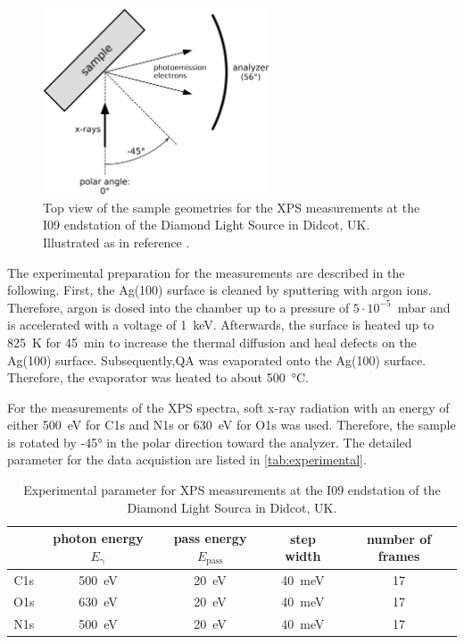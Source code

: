 \begin{figure}[htbp]
	\centering
	\includegraphics[width=0.6\textwidth]{images/experimental.png}
	\caption{Top view of the sample geometries for the \ac{XPS} measurements at the I09 endstation of the Diamond Light Source in Didcot, UK. Illustrated as in reference \cite{Kny2025}.}
	\label{fig:experimental}
\end{figure}

The experimental preparation for the measurements are described in the following. First, the Ag(100) surface is cleaned by sputtering with argon ions. Therefore, argon is dosed into the chamber up to a pressure of $5\cdot 10^{-5}$~\si{mbar} and is accelerated with a voltage of 1~\si{keV}. Afterwards, the surface is heated up to 825~\si{K} for 45~\si{min} to increase the thermal diffusion and heal defects on the Ag(100) surface.
Subsequently,\ac{QA} was evaporated onto the Ag(100) surface. Therefore, the evaporator was heated to about 500~\si{\degreeCelsius}.

For the measurements of the \ac{XPS} spectra, soft x-ray radiation with an energy of either 500~\si{\eV} for C1s and N1s or 630~\si{\eV} for O1s was used. Therefore, the sample is rotated by -45\si{\degree} in the polar direction toward the analyzer. The detailed parameter for the data acquistion are listed in \autoref{tab:experimental}.

\begin{table}[H]
	\centering
	\caption{Experimental parameter for \ac{XPS} measurements at the I09 endstation of the Diamond Light Sourca in Didcot, UK.}
	\begin{tabular}{|c|c|c|c|c|}
		\hline
		& photon energy $E_\mathrm{\gamma}$ & pass energy $E_\mathrm{pass}$ & step width & number of frames \\
		\hline
		C1s & 500~\si{\eV} & 20~\si{\eV} & 40~\si{meV} & 17 \\
		\hline
		O1s & 630~\si{\eV} & 20~\si{\eV} & 40~\si{meV} & 17 \\
		\hline
		N1s & 500~\si{\eV} & 20~\si{\eV} & 40~\si{meV} & 17 \\
		\hline
	\end{tabular}
	\label{tab:experimental}
\end{table}

